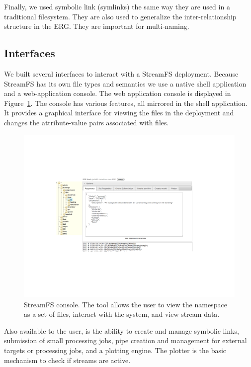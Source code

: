 Finally, we used symbolic link (symlinks) the same way they are used in a traditional filesystem.  They are also used to generalize
the inter-relationship structure in the ERG.  They are important for multi-naming.

\subsection{Interfaces}
We built several interfaces to interact with a StreamFS deployment.  Because StreamFS has its own file types and semantics
we use a native shell application and a web-application console.  The web application console is displayed in 
Figure~\ref{fig:sfsconsole}.  The console has various features, all mirrored in the shell application.  It provides
a graphical interface for viewing the files in the deployment and changes the attribute-value pairs associated with files.

\begin{figure}[htb!]
\begin{center}
\includegraphics[scale=0.6]{figs/sfs_console}
\caption{StreamFS console.  The tool allows the user to view the namespace as a set of files, interact with the system, and 
view stream data.}
\label{fig:sfsconsole}
\end{center}
\end{figure}

Also available to the user, is the ability to create and manage symbolic links, submission of small processing jobs, pipe
creation and management for external targets or processing jobs, and a plotting engine.  The plotter is the basic mechanism 
to check if streams are 
active. %



